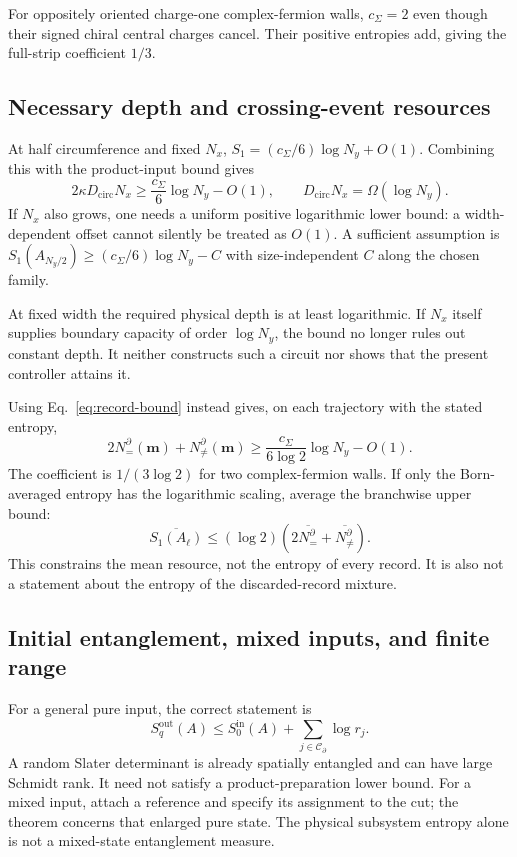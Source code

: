 \documentclass[aps,prb,onecolumn,nofootinbib,superscriptaddress]{revtex4-2}
\begin{document}
For oppositely oriented charge-one complex-fermion walls,
$c_\Sigma=2$ even though their signed chiral central charges cancel.
Their positive entropies add, giving the full-strip coefficient $1/3$.

\subsection{Necessary depth and crossing-event resources}
At half circumference and fixed $N_x$,
$S_1=(c_\Sigma/6)\log N_y+O(1)$. Combining this with the
product-input bound gives
\begin{equation}
 2\kappa D_{\mathrm{circ}}N_x
 \geq\frac{c_\Sigma}{6}\log N_y-O(1),\qquad
 D_{\mathrm{circ}}N_x=\Omega(\log N_y).
 \label{eq:resource}
\end{equation}
If $N_x$ also grows, one needs a uniform positive logarithmic lower bound:
a width-dependent offset cannot silently be treated as $O(1)$. A sufficient
assumption is $S_1(A_{N_y/2})\geq(c_\Sigma/6)\log N_y-C$ with size-independent
$C$ along the chosen family.

At fixed width the required physical depth is at least logarithmic.
If $N_x$ itself supplies boundary capacity of order $\log N_y$, the bound
no longer rules out constant depth. It neither constructs such a circuit
nor shows that the present controller attains it.

Using Eq.~\eqref{eq:record-bound} instead gives, on each trajectory with
the stated entropy,
\begin{equation}
 2N_=^\partial(\boldsymbol m)+N_{\ne}^\partial(\boldsymbol m)
 \geq\frac{c_\Sigma}{6\log2}\log N_y-O(1).
 \label{eq:record-resource}
\end{equation}
The coefficient is $1/(3\log2)$ for two complex-fermion walls. If only
the Born-averaged entropy has the logarithmic scaling, average the
branchwise upper bound:
\begin{equation}
 \overline{S_1(A_\ell)}
 \leq(\log2)\left(2\overline{N_=^\partial}
                        +\overline{N_{\ne}^\partial}\right).
 \label{eq:average-bound}
\end{equation}
This constrains the mean resource, not the entropy of every record. It is
also not a statement about the entropy of the discarded-record mixture.

\subsection{Initial entanglement, mixed inputs, and finite range}
For a general pure input, the correct statement is
\begin{equation}
 S_q^{\mathrm{out}}(A)\leq S_0^{\mathrm{in}}(A)
             +\sum_{j\in\mathcal C_\partial}\log r_j .
 \label{eq:entangled-input}
\end{equation}
A random Slater determinant is already spatially entangled and can have
large Schmidt rank. It need not satisfy a product-preparation lower bound.
For a mixed input, attach a reference and specify its assignment to the
cut; the theorem concerns that enlarged pure state. The physical
subsystem entropy alone is not a mixed-state entanglement measure.
\end{document}
